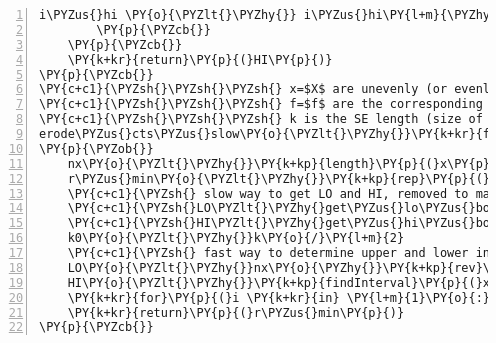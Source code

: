 \begin{Verbatim}[commandchars=\\\{\},codes={\catcode`\$=3\catcode`\^=7\catcode`\_=8},gobble=0,numbers=left,fontfamily=fvm,fontshape=n,fontsize=\footnotesize,tabsize=2]
			i\PYZus{}hi \PY{o}{\PYZlt{}\PYZhy{}} i\PYZus{}hi\PY{l+m}{\PYZhy{}1} 
		\PY{p}{\PYZcb{}}
	\PY{p}{\PYZcb{}}
	\PY{k+kr}{return}\PY{p}{(}HI\PY{p}{)}
\PY{p}{\PYZcb{}}
\PY{c+c1}{\PYZsh{}\PYZsh{}\PYZsh{} x=$X$ are unevenly (or evenly) spaced locations of the intensities}
\PY{c+c1}{\PYZsh{}\PYZsh{}\PYZsh{} f=$f$ are the corresponding intensity values}
\PY{c+c1}{\PYZsh{}\PYZsh{}\PYZsh{} k is the SE length (size of $B$)}
erode\PYZus{}cts\PYZus{}slow\PY{o}{\PYZlt{}\PYZhy{}}\PY{k+kr}{function}\PY{p}{(}x\PY{p}{,}f\PY{p}{,}k\PY{p}{)}
\PY{p}{\PYZob{}}
	nx\PY{o}{\PYZlt{}\PYZhy{}}\PY{k+kp}{length}\PY{p}{(}x\PY{p}{)}
	r\PYZus{}min\PY{o}{\PYZlt{}\PYZhy{}}\PY{k+kp}{rep}\PY{p}{(}\PY{l+m}{0}\PY{p}{,}nx\PY{p}{)}
	\PY{c+c1}{\PYZsh{} slow way to get LO and HI, removed to make comparison with erode\PYZus{}cts\PYZus{}quick() fair}
	\PY{c+c1}{\PYZsh{}LO\PYZlt{}\PYZhy{}get\PYZus{}lo\PYZus{}bounds(x,k)}
	\PY{c+c1}{\PYZsh{}HI\PYZlt{}\PYZhy{}get\PYZus{}hi\PYZus{}bounds(x,k)}
	k0\PY{o}{\PYZlt{}\PYZhy{}}k\PY{o}{/}\PY{l+m}{2}
	\PY{c+c1}{\PYZsh{} fast way to determine upper and lower indexes in R to avoid looping}
	LO\PY{o}{\PYZlt{}\PYZhy{}}nx\PY{o}{\PYZhy{}}\PY{k+kp}{rev}\PY{p}{(}\PY{k+kp}{findInterval}\PY{p}{(}\PY{k+kp}{rev}\PY{p}{(}\PY{o}{\PYZhy{}}x\PY{p}{)}\PY{p}{,}\PY{k+kp}{rev}\PY{p}{(}\PY{o}{\PYZhy{}}\PY{p}{(}x\PY{o}{+}k0\PY{p}{)}\PY{p}{)}\PY{p}{)}\PY{p}{)}\PY{l+m}{+1}
	HI\PY{o}{\PYZlt{}\PYZhy{}}\PY{k+kp}{findInterval}\PY{p}{(}x\PY{o}{+}k0\PY{p}{,}x\PY{p}{)}
	\PY{k+kr}{for}\PY{p}{(}i \PY{k+kr}{in} \PY{l+m}{1}\PY{o}{:}nx\PY{p}{)} r\PYZus{}min\PY{p}{[}i\PY{p}{]}\PY{o}{\PYZlt{}\PYZhy{}}\PY{k+kp}{min}\PY{p}{(}f\PY{p}{[}LO\PY{p}{[}i\PY{p}{]}\PY{o}{:}HI\PY{p}{[}i\PY{p}{]]}\PY{p}{)}
	\PY{k+kr}{return}\PY{p}{(}r\PYZus{}min\PY{p}{)}
\PY{p}{\PYZcb{}}
\end{Verbatim}
